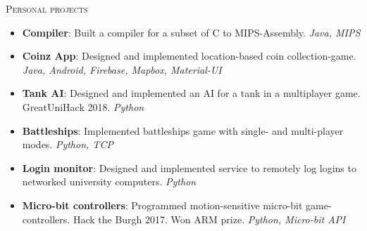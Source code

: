 \documentclass[11pt]{article}
\begin{document}
\textsc{Personal projects}





\begin{itemize}
    \item \textbf{Compiler}:
        Built a compiler for a subset of C to MIPS-Assembly. \textit{Java, MIPS}
    \item \textbf{Coinz App}:
        Designed and implemented location-based coin collection-game. \textit{Java,
        Android, Firebase, Mapbox, Material-UI}
    \item \textbf{Tank AI}:
        Designed and implemented an AI for a tank in a multiplayer game. GreatUniHack
        2018. \textit{Python}
    \item \textbf{Battleships}:
        Implemented battleships game with single- and multi-player modes. \textit{Python,
        TCP}
    \item \textbf{Login monitor}:
        Designed and implemented service to remotely log logins to networked university
        computers. \textit{Python}
    \item \textbf{Micro-bit controllers}:
        Programmed motion-sensitive micro-bit game-controllers. Hack the Burgh 2017.  Won
        ARM prize. \textit{Python, Micro-bit API}
\end{itemize}
\end{document}
